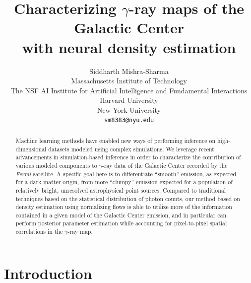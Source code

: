 \documentclass[]{article}
\title{Characterizing $\gamma$-ray maps of the Galactic Center \\ with neural density estimation}
\author{
Siddharth Mishra-Sharma \\
Massachusetts Institute of Technology \\
The NSF AI Institute for Artificial Intelligence and Fundamental Interactions \\
Harvard University \\ 
New York University \\
\texttt{sm8383@nyu.edu} \\
}
\newcommand{\Fermi}{\emph{Fermi}\xspace}
\begin{document}
\maketitle

\begin{abstract}
Machine learning methods have enabled new ways of performing inference on high-dimensional datasets modeled using complex simulations. We leverage recent advancements in simulation-based inference in order to characterize the contribution of various modeled components to $\gamma$-ray data of the Galactic Center recorded by the \Fermi satellite. A specific goal here is to differentiate ``smooth'' emission, as expected for a dark matter origin, from more ``clumpy'' emission expected for a population of relatively bright, unresolved astrophysical point sources. Compared to traditional techniques based on the statistical distribution of photon counts, our method based on density estimation using normalizing flows is able to utilize more of the information contained in a given model of the Galactic Center emission, and in particular can perform posterior parameter estimation while accounting for pixel-to-pixel spatial correlations in the $\gamma$-ray map. 

\end{abstract}

\section{Introduction}
\label{sec:intro}
\end{document}

